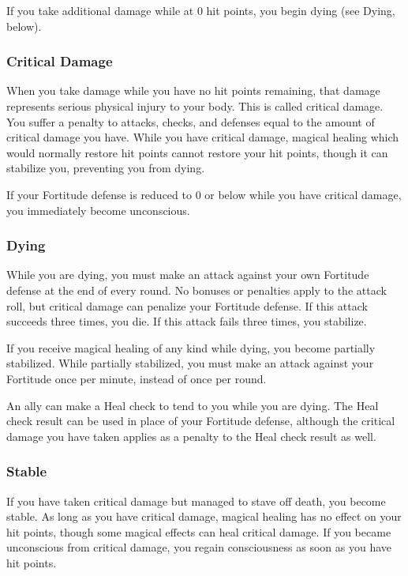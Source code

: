 If you take additional damage while at 0 hit points, you begin dying (see Dying, below).

\subsubsection{Critical Damage}\label{Critical Damage}
When you take damage while you have no hit points remaining, that damage represents serious physical injury to your body. This is called critical damage. You suffer a penalty to attacks, checks, and defenses equal to the amount of critical damage you have. While you have critical damage, magical healing which would normally restore hit points cannot restore your hit points, though it can stabilize you, preventing you from dying.

If your Fortitude defense is reduced to 0 or below while you have critical damage, you immediately become unconscious.

\subsubsection{Dying}\label{Dying}
While you are dying, you must make an attack against your own Fortitude defense at the end of every round. No bonuses or penalties apply to the attack roll, but critical damage can penalize your Fortitude defense. If this attack succeeds three times, you die. If this attack fails three times, you stabilize.

If you receive magical healing of any kind while dying, you become partially stabilized. While partially stabilized, you must make an attack against your Fortitude once per minute, instead of once per round.

An ally can make a Heal check to tend to you while you are dying. The Heal check result can be used in place of your Fortitude defense, although the critical damage you have taken applies as a penalty to the Heal check result as well.

\subsubsection{Stable}\label{Stable}
If you have taken critical damage but managed to stave off death, you become stable. As long as you have critical damage, magical healing has no effect on your hit points, though some magical effects can heal critical damage. If you became unconscious from critical damage, you regain consciousness as soon as you have hit points.

